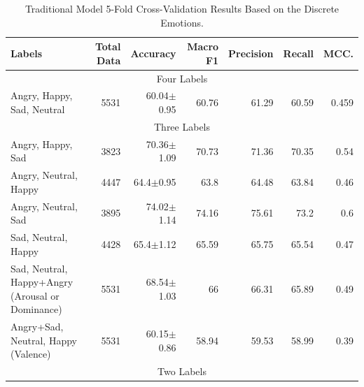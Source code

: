 \begin{table}[H]
\small
\centering
\caption{Traditional Model 5-Fold Cross-Validation Results Based on the Discrete Emotions.}
\label{tab:emo_cat}
    \centering
    \begin{tabular}{lrrrrrr}
    	\toprule
    	Labels                      &   Total Data & Accuracy    & Macro F1    & Precision   & Recall      & MCC.       \\
    	\midrule
 	    \multicolumn{7}{c}{Four Labels} \\
    	Angry, Happy, Sad, Neutral             &         5531 &  60.04$\pm$0.95 & 60.76 & 61.29 & 60.59 & 0.459 \\
    	\midrule
    	\multicolumn{7}{c}{Three Labels} \\
    	
		Angry, Happy, Sad                   &         3823 & 70.36$\pm$1.09 &      70.73 &       71.36 &    70.35 &   0.54 \\
		Angry, Neutral, Happy               &         4447 & 64.4$\pm$0.95  &      63.8  &       64.48 &    63.84 &   0.46 \\
		Angry, Neutral, Sad                 &         3895 & 74.02$\pm$1.14 &      74.16 &       75.61 &    73.2  &   0.6  \\
		Sad, Neutral, Happy                 &         4428 & 65.4$\pm$1.12  &      65.59 &       65.75 &    65.54 &   0.47 \\
		
		Sad, Neutral, Happy+Angry (Arousal or Dominance) &         5531 & 68.54$\pm$1.03 &      66    &       66.31 &    65.89 &   0.49 \\
		Angry+Sad, Neutral, Happy (Valence) &         5531 & 60.15$\pm$0.86 &      58.94 &       59.53 &    58.99 &   0.39 \\
    	\midrule
    	\multicolumn{7}{c}{Two Labels} \\
    	    	

\end{tabular}
\end{table}
